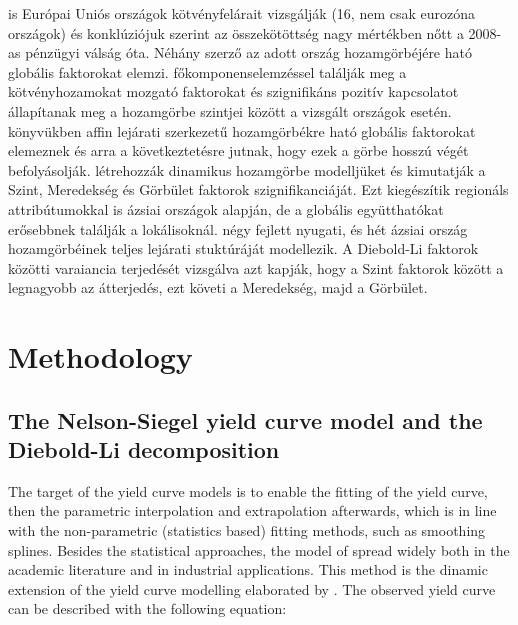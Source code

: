 \documentclass[12pt,bibliography=totoc]{article}
\begin{document}
{\cite{claeys2014measuring} is Európai Uniós országok kötvényfelárait vizsgálják (16, nem csak eurozóna országok) és konklúziójuk szerint az összekötöttség nagy mértékben nőtt a 2008-as pénzügyi válság óta.
Néhány szerző az adott ország hozamgörbéjére ható globális faktorokat elemzi. \cite{driessen2003common} főkomponenselemzéssel találják meg a kötvényhozamokat mozgató faktorokat és szignifikáns pozitív kapcsolatot állapítanak meg a hozamgörbe szintjei között a vizsgált országok esetén.
\cite{abbritti2013global} könyvükben affin lejárati szerkezetű hozamgörbékre ható globális faktorokat elemeznek és arra a következtetésre jutnak, hogy ezek a görbe hosszú végét befolyásolják.
\cite{diebold2008global} létrehozzák dinamikus hozamgörbe modelljüket és kimutatják a Szint, Meredekség és Görbület faktorok szignifikanciáját.
Ezt \cite{bae2011global} kiegészítik regionáls attribútumokkal is ázsiai országok alapján, de a globális együtthatókat erősebbnek találják a lokálisoknál.
\cite{sowmya2016linkages} négy fejlett nyugati, és hét ázsiai ország hozamgörbéinek teljes lejárati stuktúráját modellezik. A Diebold-Li faktorok közötti varaiancia terjedését vizsgálva azt kapják, hogy a Szint faktorok között a legnagyobb az átterjedés, ezt követi a Meredekség, majd a Görbület.}




\newpage 


\section{Methodology}
\noindent
\subsection{The Nelson-Siegel yield curve model and the Diebold-Li decomposition}


The target of the yield curve models is to enable the fitting of the yield curve, then the parametric interpolation and extrapolation afterwards, which is in line with the non-parametric (statistics based) fitting methods, such as smoothing splines.
Besides the statistical approaches, the model of \cite{diebold2006forecasting} spread widely both in the academic literature and in industrial applications. This method is the dinamic extension of the yield curve modelling elaborated by \cite{nelson1987parsimonious}. The observed yield curve can be described with the following equation:
\end{document}
